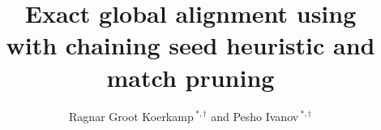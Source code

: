 \documentclass[nocrop]{bioinfo}
\begin{document}

\subtitle{}

\title[Exact global alignment using \A]{Exact global alignment using \A\\ with chaining seed heuristic and match pruning}
\author[R. {Groot Koerkamp} and P. Ivanov]{Ragnar {Groot Koerkamp}\,$^{*,\dagger}$ and Pesho Ivanov\,$^{*,\dagger}$} %
\address{Department of Computer Science, ETH Zurich, Switzerland}%


\history{}

\editor{}


\maketitle








%





\appendix
\renewcommand{\thesection}{\Alph{section}}

\end{document}
